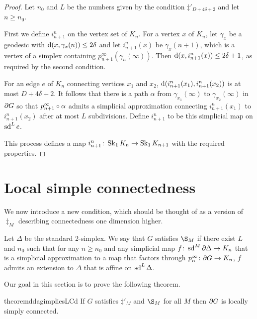 \documentclass[a4paper]{article}
\begin{document}
\begin{proof}
  Let $n_0$ and $L$ be the numbers given by the condition $\ddag'_{D + 4\delta
  + 2}$ and let $n \geq n_0$.

  First we define $i^n_{n+1}$ on the vertex set of $K_n$. For a vertex $x$ of
  $K_n$, let $\gamma_x$ be a geodesic with $\operatorname{d}(x, \gamma_x(n)) \leq 2\delta$
  and let $i^n_{n+1}(x)$ be $\gamma_x(n+1)$, which is a vertex of a simplex
  containing $p^\infty_{n+1}(\gamma_n(\infty))$. Then $\operatorname{d}(x, i^n_{n+1}(x))
  \leq 2\delta + 1$, as required by the second condition.

  For an edge $e$ of $K_n$ connecting vertices $x_1$ and $x_2$,
  $\operatorname{d}(i^n_{n+1}(x_1), i^n_{n+1}(x_2))$ is at most $D + 4\delta + 2$. It
  follows that there is a path $\alpha$ from $\gamma_{x_1}(\infty)$ to
  $\gamma_{x_2}(\infty)$ in $\partial G$ so that
  $p^\infty_{n+1}\circ\alpha$ admits a simplicial approximation connecting
  $i^n_{n+1}(x_1)$ to $i^n_{n+1}(x_2)$ after at most $L$ subdivisions. Define
  $i^n_{n+1}$ to be this simplicial map on $\operatorname{sd}^L e$.

  This process defines a map $i^n_{n+1}\colon \operatorname{Sk}_1 K_n\to \operatorname{Sk}_1 K_{n+1}$
  with the required properties.
\end{proof}

\section{Local simple connectedness}

We now introduce a new condition, which should be thought of as a version of
$\ddag_M$ describing connectedness one dimension higher.

\begin{definition}
  Let $\Delta$ be the standard 2-simplex.  We say that $G$ satisfies $\S_M$ if
  there exist $L$ and $n_0$ such that for any $n\geq n_0$ and any simplicial
  map $f\colon \operatorname{sd}^M\partial\Delta \to K_n$ that is a simplicial approximation
  to a map that factors through $p^\infty_n \colon \partial G \to K_n$, $f$
  admits an extension to $\Delta$ that is affine on $\operatorname{sd}^L \Delta$.
\end{definition}

Our goal in this section is to prove the following theorem.

\begin{restatable}{theorem}{ddagimpliesLCd}\label{thm:ddagimpliesLCd}
  If $G$ satisfies $\ddag'_M$ and $\S_M$ for all $M$ then $\partial G$ is
  locally simply connected.
\end{restatable}
\end{document}
